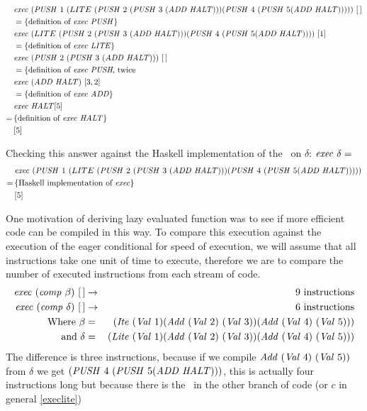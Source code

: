 \documentclass {article}
\begin{document}
\begin{align*}
&\mathit{exec\ } (\mathit{PUSH\ } 1\ (LITE\ (\mathit{PUSH\ } 2\ (\mathit{PUSH\ } 3\ (\mathit{ADD\ }  \mathit{HALT}))) (\mathit{PUSH\ } 4\ (\mathit{PUSH\ } 5 (\mathit{ADD\ }  \mathit{HALT})))))\ [\, ] \\
&=\{\mbox{definition of \textit{exec}\ \textit{PUSH}} \} \\
&\mathit{exec\ } (LITE\ (\mathit{PUSH\ } 2\ (\mathit{PUSH\ } 3\ (\mathit{ADD\ }  \mathit{HALT}))) (\mathit{PUSH\ } 4\ (\mathit{PUSH\ } 5 (\mathit{ADD\ }  \mathit{HALT}))))\ [1] \\
&=\{\mbox{definition of \textit{exec}\ \textit{LITE}} \} \\
&\mathit{exec\ } (\mathit{PUSH\ } 2\ (\mathit{PUSH\ } 3\ (\mathit{ADD\ }  \mathit{HALT})))\ [\, ] \\
&=\{\mbox{definition of \textit{exec}\ \textit{PUSH}, twice} \\
&\mathit{exec\ } (\mathit{ADD\ }  \mathit{HALT})\ [3, 2] \\
&=\{\mbox{definition of \textit{exec}\ \textit{ADD}} \} \\
&\mathit{exec\ } \mathit{HALT} [5] \\
=\, & \{\mbox{definition of \textit{exec}\ \textit{HALT}}\} \\
&[5]
\end{align*}

Checking this answer against the Haskell 
implementation of the \vm\ on $\delta$:
\( \mathit{exec\ } \delta = \)
\begin{align*}	
&\Exec (\PUSH 1\ (LITE\ 
	(\PUSH 2\ (\PUSH 3\ (\ADD  \HALT))) 
	(\PUSH 4\ (\PUSH 5 (\ADD  \HALT))))) \\
=\, &\{ \mbox{Haskell implementation of \exec} \} \\
&[5]
\end{align*}

One motivation of deriving lazy evaluated function
was to see if more efficient code can be compiled
in this way. 
To compare this execution against the execution of 
the eager conditional for speed of execution,
we will assume that all instructions take one unit of time
to execute, therefore we are to compare the number of 
executed instructions from each stream of code.
\begin{eqnarray*}
\mathit{exec\ } (\mathit{comp\ } \beta)\ [\, ] &\rightarrow& \mbox{9 instructions} \\
\mathit{exec\ } (\mathit{comp\ } \delta)\ [\, ] &\rightarrow& \mbox{6 instructions} \\
\mbox{Where } \beta &=& (\mathit{Ite\ } (\mathit{Val\ } 1)(\mathit{Add\ } (\mathit{Val\ } 2)\ (\mathit{Val\ } 3))
									(\mathit{Add\ } (\mathit{Val\ } 4)\ (\mathit{Val\ } 5))) \\
\mbox{and } \delta &=& (\mathit{Lite\ } (\mathit{Val\ } 1)(\mathit{Add\ } (\mathit{Val\ } 2)\ (\mathit{Val\ } 3))
										(\mathit{Add\ } (\mathit{Val\ } 4)\ (\mathit{Val\ } 5))) \\
\end{eqnarray*}
The difference is three instructions, 
because if we compile  \( \mathit{Add\ } (\mathit{Val\ } 4)\ (\mathit{Val\ } 5)) \)
from $\delta$
we get \( (\mathit{PUSH\ } 4\ (\mathit{PUSH\ } 5 (\mathit{ADD\ }  \mathit{HALT})))\),
this is actually four instructions long but because 
there is the \HALTt\ in the other branch of code 
(or $c$ in general \ref{execlite})
\end{document}
